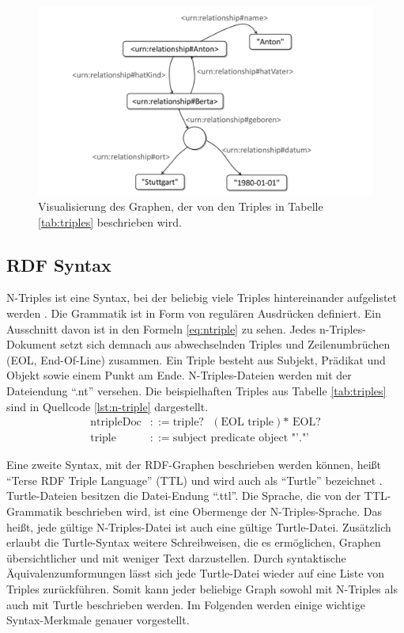 \begin{figure}
	\centering
	\includegraphics[width=0.7\linewidth]{resources/figures/rdfGraph}
	\caption{Visualisierung des Graphen, der von den Triples in Tabelle \ref{tab:triples} beschrieben wird. }
	\label{fig:rdfgraph}
\end{figure}


\subsection{RDF Syntax}

N-Triples ist eine Syntax, bei der beliebig viele Triples hintereinander aufgelistet werden \cite[vgl.][]{w3c2014ntriples}. Die Grammatik ist in Form von regulären Ausdrücken definiert. Ein Ausschnitt davon ist in den Formeln \ref{eq:ntriple} zu sehen. Jedes n-Triples-Dokument setzt sich demnach aus abwechselnden Triples und Zeilenumbrüchen (EOL, End-Of-Line) zusammen. Ein Triple besteht aus Subjekt, Prädikat und Objekt sowie einem Punkt am Ende. N-Triples-Dateien werden mit der Dateiendung "`.nt"' versehen. Die beispielhaften Triples aus Tabelle \ref{tab:triples} sind in Quellcode \ref{lst:n-triple} dargestellt.
\begin{align}
	\text{ntripleDoc} & ::= \text{triple?}\text{ } (\text{EOL triple})\mbox{*} \text{ EOL?} \label{eq:ntriple}\\
	\text{triple} & ::= \text{subject } \text{predicate } \text{object } \text{"'."'} \nonumber
\end{align}

Eine zweite Syntax, mit der RDF-Graphen beschrieben werden können, heißt "`Terse RDF Triple Language"' (TTL) und wird auch als "`Turtle"' bezeichnet  \cite[vgl.][]{w3c2014turtle}. Turtle-Dateien besitzen die Datei-Endung "`.ttl"'.
Die Sprache, die von der TTL-Grammatik beschrieben wird, ist eine Obermenge der N-Triples-Sprache. Das heißt, jede gültige N-Triples-Datei ist auch eine gültige Turtle-Datei. Zusätzlich erlaubt die Turtle-Syntax weitere Schreibweisen, die es ermöglichen, Graphen übersichtlicher und mit weniger Text darzustellen. Durch syntaktische Äquivalenzumformungen lässt sich jede Turtle-Datei wieder auf eine Liste von Triples zurückführen. Somit kann jeder beliebige Graph sowohl mit N-Triples als auch mit Turtle beschrieben werden. Im Folgenden werden einige wichtige Syntax-Merkmale genauer vorgestellt.
